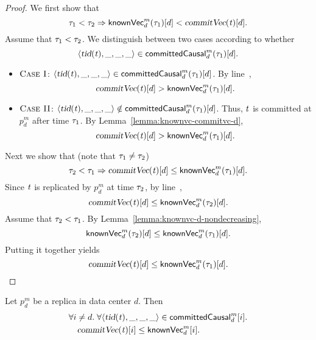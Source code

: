 \begin{proof} \label{proof:heartbeat-replication-order}
  We first show that
  \[
    \realtime_{1} < \realtime_{2} \implies \knownVC^{m}_{d}(\realtime_{1})[d] < \commitVC(\tvar)[d].
  \]
  Assume that $\tau_{1} < \tau_{2}$.
  We distinguish between two cases according to whether
  \[
    \langle \textsl{tid}(\mathit{t}), \_, \_, \_ \rangle \in {\sf committedCausal}^{m}_{d}(\tau_{1})[d].
  \]
  \begin{itemize}
    \item $\textsc{Case I}$:
      $\langle \textsl{tid}(\mathit{t}), \_, \_, \_ \rangle \in {\sf committedCausal}^{m}_{d}(\tau_{1})[d]$.
      By line~\code{\ref{alg:unistore-replication}}{\ref{line:propagate-txs}},
      \[
        \textsl{commitVec}(\mathit{t})[d] > {\sf knownVec}^{m}_{d}(\tau_{1})[d].
      \]
    \item $\textsc{Case II}$:
      $\langle \textsl{tid}(\mathit{t}), \_, \_, \_ \rangle \notin {\sf committedCausal}^{m}_{d}(\tau_{1})[d]$.
      Thus, $\mathit{t}$ is committed at $p^{m}_{d}$ after time $\tau_{1}$.
      By Lemma~\ref{lemma:knownvc-commitvc-d},
      \[
        \textsl{commitVec}(\mathit{t})[d] > {\sf knownVec}^{m}_{d}(\tau_{1})[d].
      \]
  \end{itemize}

  Next we show that (note that $\tau_{1} \neq \tau_{2}$)
  \[
    \realtime_{2} < \realtime_{1} \implies \commitVC(\tvar)[d] \le \knownVC^{m}_{d}(\realtime_{1})[d].
  \]
  Since $\mathit{t}$ is replicated by $p^{m}_{d}$ at time $\tau_{2}$,
  by line~\code{\ref{alg:unistore-replication}}{\ref{line:propagate-txs}},
  \[
    \textsl{commitVec}(\mathit{t})[d] \le {\sf knownVec}^{m}_{d}(\tau_{2})[d].
  \]
  Assume that $\tau_{2} < \tau_{1}$.
  By Lemma~\ref{lemma:knownvc-d-nondecreasing},
  \[
    {\sf knownVec}^{m}_{d}(\tau_{2})[d] \le {\sf knownVec}^{m}_{d}(\tau_{1})[d].
  \]
  Putting it together yields
  \[
    \textsl{commitVec}(\mathit{t})[d] \le {\sf knownVec}^{m}_{d}(\tau_{1})[d].
  \]
\end{proof}

\begin{applemma} \label{lemma:committedcausal-i}
  Let $p^{m}_{d}$ be a replica in data center $d$. Then
  \begin{align*}
    &\forall i \neq d.\;
      \forall \langle \textsl{tid}(\mathit{t}), \_, \_, \_ \rangle \in {\sf committedCausal}^{m}_{d}[i]. \\
        &\quad \textsl{commitVec}(\mathit{t})[i] \le {\sf knownVec}^{m}_{d}[i].
  \end{align*}
\end{applemma}

